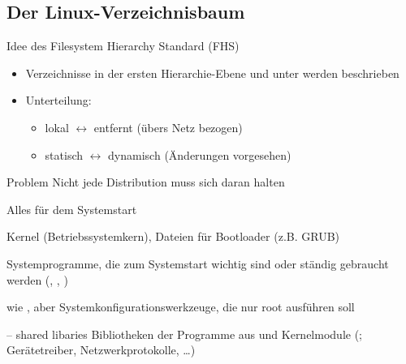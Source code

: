 \documentclass[aspectratio=43]{beamer}
\begin{document}
\subsection{Der Linux-Verzeichnisbaum}
\begin{frame}{}
  \begin{exampleblock}{Idee des Filesystem Hierarchy Standard (FHS)}
    \begin{itemize}
     \item Verzeichnisse in der ersten Hierarchie-Ebene und unter  werden beschrieben
     \item Unterteilung:
      \begin{itemize}
       \item lokal $\leftrightarrow$ entfernt (übers Netz bezogen)
       \item statisch $\leftrightarrow$ dynamisch (Änderungen vorgesehen)
      \end{itemize}

    \end{itemize}

  \end{exampleblock}
  \begin{alertblock}{Problem}
    Nicht jede Distribution muss sich daran halten
  \end{alertblock}

\end{frame}

\begin{frame}{Alles für dem Systemstart}
  \begin{block}{}
        Kernel (Betriebssystemkern),
       Dateien für Bootloader (z.B. GRUB)
  \end{block}
  \begin{block}{}
    Systemprogramme, die zum Systemstart wichtig sind oder ständig gebraucht werden
    (, , )
  \end{block}
  \begin{block}{}
    wie , aber Systemkonfigurationswerkzeuge, die nur root ausführen soll
  \end{block}
  \begin{block}{ --  shared libaries}
      Bibliotheken der Programme aus  und 
      Kernelmodule (; Gerätetreiber, Netzwerkprotokolle, \dots)
  \end{block}
\end{frame}
\end{document}
